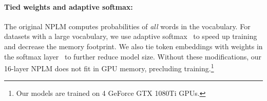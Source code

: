 \documentclass[11pt]{article}
\begin{document}
\begin{table*}[t]
\centering
{}
\caption{Our Transformer variants improve on the baseline Transformer across three word-level LM datasets. The \# of model parameters is shown in brackets (same for all models). For model details, see Appendix \ref{appendix:config}. }
    \label{tab:main-res}
\end{table*}


\paragraph{Tied weights and adaptive softmax:} The original NPLM computes probabilities of \emph{all} words in the vocabulary. For datasets with a large vocabulary, we use adaptive softmax~\cite{pmlr-v70-grave17a} to speed up training and decrease the memory footprint. We also tie token embeddings with weights in the softmax layer~\citep{press-wolf-2017-using} to further reduce  model size. Without these modifications, our 16-layer NPLM does not fit in GPU memory, precluding training.\footnote{Our models are trained on 4 GeForce GTX 1080Ti GPUs.}
\end{document}
